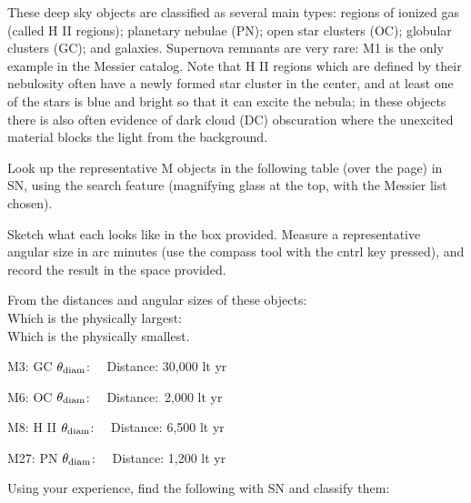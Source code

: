 \documentclass[12pt]{article}
\begin{document}
These deep sky objects are classified as several main types: regions of ionized
gas (called H II regions); planetary nebulae (PN); open star clusters
(OC); globular clusters (GC); and galaxies. Supernova remnants are
very rare: M1 is the only example in the Messier catalog.  Note that
H II regions which are defined by their nebulosity often have a newly
formed star cluster in the center, and at least one of the stars is
blue and bright so that it can excite the nebula; in these objects
there is also often evidence of dark cloud (DC) obscuration where the
unexcited material blocks the light from the background.

\bigskip
\noindent
Look up the representative M objects in the following table (over the
page) in SN,
using the search feature (magnifying glass at the top, with the
Messier list chosen). 

\bigskip
\noindent
Sketch what each looks like in the box provided. Measure a
representative angular size in arc minutes (use the compass tool with
the cntrl key pressed), and record the result in
the space provided.

\bigskip
\noindent
From the distances and angular sizes of these objects: \\
Which is the physically largest: \makebox[3cm]{\hrulefill}\\
Which is the physically smallest.\makebox[3cm]{\hrulefill}

\newpage

\noindent
{\framebox[3.0cm]{\rule[-1.5cm]{0cm}{3cm}\,} \hspace{0.5cm}
M3: GC \hfill $\theta_{\rm diam}$: \makebox[3cm]{\hrulefill} \ \ Distance: 
30,000 lt yr}

\bigskip
\noindent
{\framebox[3.0cm]{\rule[-1.5cm]{0cm}{3cm}\,} \hspace{0.5cm}
M6: OC  \hfill $\theta_{\rm diam}$: \makebox[3cm]{\hrulefill} \ \ 
Distance:\ 2,000 lt yr}

\bigskip
\noindent
{\framebox[3.0cm]{\rule[-1.5cm]{0cm}{3cm}\,} \hspace{0.5cm}
M8: H II \hfill $\theta_{\rm diam}$: \makebox[3cm]{\hrulefill} \ \ 
Distance: 6,500 lt yr}

\bigskip
\noindent
{\framebox[3.0cm]{\rule[-1.5cm]{0cm}{3cm}\,} \hspace{0.5cm}
M27: PN \hfill $\theta_{\rm diam}$: \makebox[3cm]{\hrulefill} \ \ 
Distance: 1,200 lt yr}

\bigskip
\bigskip
\bigskip
\noindent
Using your experience, find the following with SN and classify them:
\end{document}
